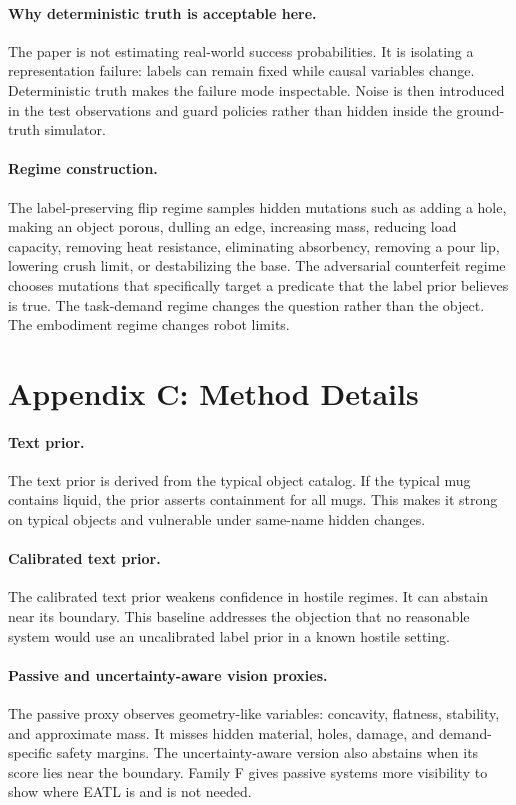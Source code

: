 \documentclass{article}
\begin{document}
\paragraph{Why deterministic truth is acceptable here.}
The paper is not estimating real-world success probabilities.  It is isolating
a representation failure: labels can remain fixed while causal variables
change.  Deterministic truth makes the failure mode inspectable.  Noise is then
introduced in the test observations and guard policies rather than hidden
inside the ground-truth simulator.

\paragraph{Regime construction.}
The label-preserving flip regime samples hidden mutations such as adding a hole,
making an object porous, dulling an edge, increasing mass, reducing load
capacity, removing heat resistance, eliminating absorbency, removing a pour lip,
lowering crush limit, or destabilizing the base.  The adversarial counterfeit
regime chooses mutations that specifically target a predicate that the label
prior believes is true.  The task-demand regime changes the question rather
than the object.  The embodiment regime changes robot limits.

\section{Appendix C: Method Details}

\paragraph{Text prior.}
The text prior is derived from the typical object catalog.  If the typical mug
contains liquid, the prior asserts containment for all mugs.  This makes it
strong on typical objects and vulnerable under same-name hidden changes.

\paragraph{Calibrated text prior.}
The calibrated text prior weakens confidence in hostile regimes.  It can abstain
near its boundary.  This baseline addresses the objection that no reasonable
system would use an uncalibrated label prior in a known hostile setting.

\paragraph{Passive and uncertainty-aware vision proxies.}
The passive proxy observes geometry-like variables: concavity, flatness,
stability, and approximate mass.  It misses hidden material, holes, damage, and
demand-specific safety margins.  The uncertainty-aware version also abstains
when its score lies near the boundary.  Family F gives passive systems more
visibility to show where EATL is and is not needed.
\end{document}
